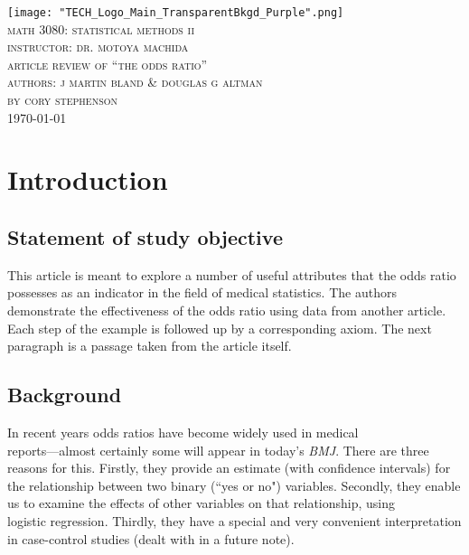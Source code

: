 \documentclass{article}
\begin{document}


\begin{titlepage}
	\begin{center}
	\texttt{[image: "TECH\_Logo\_Main\_TransparentBkgd\_Purple".png]} \\
	[2mm]
	\textsc{\Large math 3080: statistical methods ii} \\
	[0.75cm]
	\textsc{\Large instructor: dr. motoya machida} \\
	[0.75cm]
	\textsc{\Large article review of ``the odds ratio''} \\
	[0.75cm]
	\textsc{\Large authors: j martin bland \& douglas g altman} \\
	[0.75cm]
	\textsc{\Large by cory stephenson }\\
	[0.75cm]
	\textsc{\Large \today}\\
	
	
	 \end{center}
        
\end{titlepage}

\tableofcontents
\thispagestyle{empty}
\cleardoublepage

\setcounter{page}{1}

\section{Introduction}
	\subsection{Statement of study objective}
			
This article is meant to explore a number of useful attributes that the odds ratio possesses as an indicator in the field of medical statistics. The authors demonstrate the effectiveness of the odds ratio using data from another article. Each step of the example is followed up by a corresponding axiom. The next paragraph is a passage taken from the article itself.   

	\subsection{Background}\label{ssec:back}
	
In recent years odds ratios have become widely used in medical\\ reports---almost certainly some will appear in today's \textit{BMJ}. There are three reasons for this. Firstly, they provide an estimate (with confidence intervals) for the relationship between two binary (``yes or no") variables. Secondly, they enable us to examine the effects of other variables on that relationship, using\\ logistic regression. Thirdly, they have a special and very convenient interpretation in case-control studies (dealt with in a future note).\cite{BMJ:1}
\end{document}
